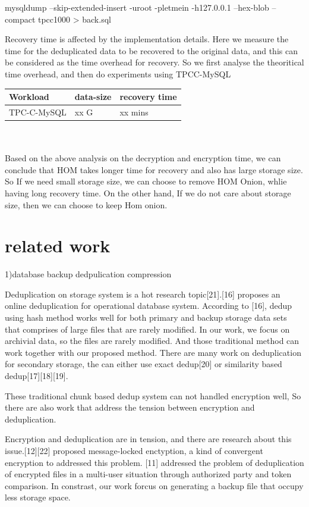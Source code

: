 mysqldump --skip-extended-insert -uroot -pletmein -h127.0.0.1 --hex-blob --compact tpcc1000 > back.sql



Recovery time is affected by the implementation details. Here we measure the time for the deduplicated data to be recovered to the original data, and this can be considered as the time overhead for recovery. So we first analyse the theoritical time overhead, and then do experiments using TPCC-MySQL

\begin{tabular}{ | l | l | l|}
\hline Workload & data-size & recovery time
\\ \hline TPC-C-MySQL & xx G &xx mins
\\ \hline \end{tabular}
\\ \\


Based on the above analysis on the decryption and encryption time, we can conclude that HOM takes longer time for recovery and also has large storage size. So If we need small storage size, we can choose to remove HOM Onion, whlie having long recovery time. On the other hand, If we do not care about storage size, then we can choose to keep Hom onion. 







\section{related work}

1)database backup dedpulication compression

Deduplication on storage system is a hot research topic[21].[16] proposes an online deduplication for operational database system. According to [16], dedup using hash method works well for both primary and backup storage data sets that comprises of large files that are rarely modified. In our work, we focus on archivial data, so the files are rarely modified. And those traditional method can work together with our proposed method. There are many work on deduplication for secondary storage, the can either use exact dedup[20] or similarity based dedup[17][18][19].

These traditional chunk based dedup system can not handled encryption well, So there are also work that address the tension between encryption and deduplication. 

Encryption and deduplication are in tension, and there are research about this issue.[12][22] proposed message-locked enctyption, a kind of convergent encryption to addressed this problem. [11] addressed the problem of deduplication of encrypted files in a multi-user situation through authorized party and token comparison. In constrast, our work forcus on generating a backup file that occupy less storage space.







